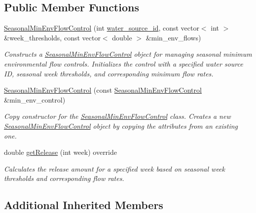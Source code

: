 \subsection*{Public Member Functions}
\begin{DoxyCompactItemize}
\item 
\mbox{\hyperlink{classSeasonalMinEnvFlowControl_a02ea55181dd200190a6b792e57f30193}{Seasonal\+Min\+Env\+Flow\+Control}} (int \mbox{\hyperlink{classMinEnvFlowControl_aada518a047598f386daec1d0358023aa}{water\+\_\+source\+\_\+id}}, const vector$<$ int $>$ \&week\+\_\+thresholds, const vector$<$ double $>$ \&min\+\_\+env\+\_\+flows)
\begin{DoxyCompactList}\small\item\em Constructs a {\ttfamily \mbox{\hyperlink{classSeasonalMinEnvFlowControl}{Seasonal\+Min\+Env\+Flow\+Control}}} object for managing seasonal minimum environmental flow controls. Initializes the control with a specified water source ID, seasonal week thresholds, and corresponding minimum flow rates. \end{DoxyCompactList}\item 
\mbox{\hyperlink{classSeasonalMinEnvFlowControl_ad0eeb570fc096a92b788b5c4a48bcec4}{Seasonal\+Min\+Env\+Flow\+Control}} (const \mbox{\hyperlink{classSeasonalMinEnvFlowControl}{Seasonal\+Min\+Env\+Flow\+Control}} \&min\+\_\+env\+\_\+control)
\begin{DoxyCompactList}\small\item\em Copy constructor for the {\ttfamily \mbox{\hyperlink{classSeasonalMinEnvFlowControl}{Seasonal\+Min\+Env\+Flow\+Control}}} class. Creates a new {\ttfamily \mbox{\hyperlink{classSeasonalMinEnvFlowControl}{Seasonal\+Min\+Env\+Flow\+Control}}} object by copying the attributes from an existing one. \end{DoxyCompactList}\item 
double \mbox{\hyperlink{classSeasonalMinEnvFlowControl_a5c5ddcab367812bdd2e23b383449d202}{get\+Release}} (int week) override
\begin{DoxyCompactList}\small\item\em Calculates the release amount for a specified week based on seasonal week thresholds and corresponding flow rates. \end{DoxyCompactList}\end{DoxyCompactItemize}
\subsection*{Additional Inherited Members}


